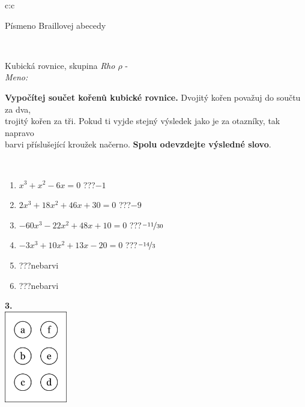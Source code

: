 \documentclass[10pt]{report}
\begin{document}
\begin{tabular}{c:c}
\begin{minipage}[c][104.5mm][t]{0.5\linewidth}
\begin{center}
\begin{minipage}{0.20\linewidth}
\begin{center}
{\small Písmeno Braillovej abecedy}
\end{center}
\end{minipage}
\end{center}
\end{minipage}
\\ \hdashline
\begin{minipage}[c][104.5mm][t]{0.5\linewidth}
\begin{center}
\vspace{7mm}
{\huge Kubická rovnice, skupina \textit{Rho $\rho$} -}\\[5mm]
\textit{Meno:}\phantom{xxxxxxxxxxxxxxxxxxxxxxxxxxxxxxxxxxxxxxxxxxxxxxxxxxxxxxxxxxxxxxxxx}\\[5mm]
\begin{minipage}{0.95\linewidth}
\textbf{Vypočítej součet kořenů kubické rovnice.} Dvojitý kořen považuj do součtu za dva,\\trojitý kořen za tři. Pokud ti vyjde stejný výsledek jako je za otazníky, tak napravo\\barvi příslušející kroužek načerno. \textbf{Spolu odevzdejte výsledné slovo}.
\end{minipage}
\\[1mm]
\begin{minipage}{0.79\linewidth}
\begin{center}
\begin{varwidth}{\linewidth}
\begin{enumerate}
\Large
\item $x^3+x^2-6x=0$\quad \dotfill\; ???\;\dotfill \quad $-1$
\item $2x^3+18x^2+46x+30=0$\quad \dotfill\; ???\;\dotfill \quad $-9$
\item $-60x^3-22x^2+48x+10=0$\quad \dotfill\; ???\;\dotfill \quad $\nicefrac{-11}{30}$
\item $-3x^3+10x^2+13x-20=0$\quad \dotfill\; ???\;\dotfill \quad $\nicefrac{-14}{3}$
\item \quad \dotfill\; ???\;\dotfill \quad nebarvi
\item \quad \dotfill\; ???\;\dotfill \quad nebarvi
\end{enumerate}
\end{varwidth}
\end{center}
\end{minipage}
\begin{minipage}{0.20\linewidth}
\begin{center}
{\Huge\bfseries 3.} \\[2mm]
\includegraphics[height=40mm]{../images/braille.png}

\end{center}
\end{minipage}
\end{center}
\end{minipage}
\end{tabular}
\end{document}
